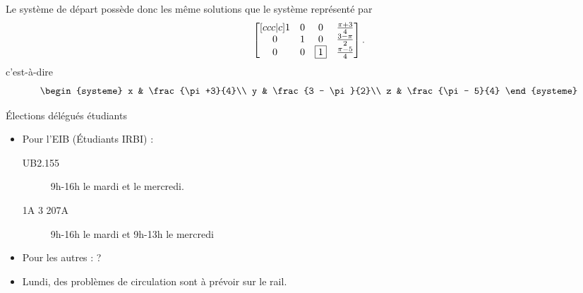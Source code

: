 \begin{frame}
Le système de départ possède donc les même solutions que le système représenté par
\begin{equation*}
  \begin{bmatrix}[ccc|c]
    1 & 0        & 0 & \frac{\pi + 3}{4}  \\
    0 & 1 & 0  & \frac{3 - \pi}{2} \\
    0 & 0 & \fbox{1} & \frac{\pi -5}{4}
  \end{bmatrix}.
\end{equation*}\pause{}
c'est-à-dire
\begin{equation*}
  \begin{systeme}
    x & \frac{\pi +3}{4}\\
    y & \frac{3 - \pi}{2}\\
    z & \frac{\pi - 5}{4}
  \end{systeme}
\end{equation*}
\end{frame}
\begin{frame}{Élections délégués étudiants}
  \begin{itemize}
  \item Pour l'EIB (Étudiants IRBI) :
    \begin{description}
    \item[UB2.155] 9h-16h le mardi et le mercredi.
    \item[1A 3 207A] 9h-16h le mardi et 9h-13h le mercredi
    \end{description}
  \item Pour les autres : ?
  \end{itemize}

  \begin{itemize}
  \item Lundi, des problèmes de circulation sont à prévoir sur le rail.
  \end{itemize}
\end{frame}

